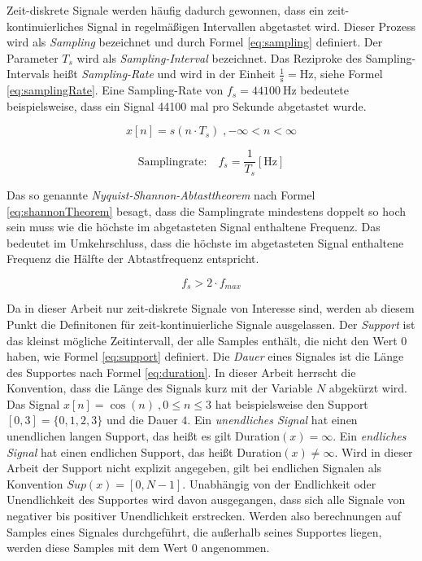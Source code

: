 Zeit-diskrete Signale werden häufig dadurch gewonnen, dass ein zeit-kontinuierliches Signal in regelmäßigen Intervallen abgetastet wird. Dieser Prozess wird als \emph{Sampling} bezeichnet und durch Formel \ref{eq:sampling} definiert. Der Parameter $T_s$ wird als \emph{Sampling-Interval} bezeichnet. Das Reziproke des Sampling-Intervals heißt \emph{Sampling-Rate} und wird in der Einheit $\frac{1}{\text{s}} = \text{Hz}$, siehe Formel \ref{eq:samplingRate}. Eine Sampling-Rate von $f_s = \SI{44100}{\hertz}$ bedeutete beispielsweise, dass ein Signal 44100 mal pro Sekunde abgetastet wurde.\cite[S. 24]{dspMichigan}

\begin{equation}
x[n] = s(n \cdot T_s) \; , -\infty < n < \infty
\label{eq:sampling}
\end{equation}
	
\begin{equation}
	\text{Samplingrate:} \quad f_s = \frac{1}{T_s} [\text{Hz}]
	\label{eq:samplingRate}
\end{equation}	

Das so genannte \emph{Nyquist-Shannon-Abtasttheorem} nach Formel \ref{eq:shannonTheorem} besagt, dass die Samplingrate mindestens doppelt so hoch sein muss wie die höchste im abgetasteten Signal enthaltene Frequenz. Das bedeutet im Umkehrschluss, dass die höchste im abgetasteten Signal enthaltene Frequenz die Hälfte der Abtastfrequenz entspricht.

\begin{equation}
f_s > 2 \cdot f_{max}
\label{eq:shannonTheorem}
\end{equation}	
	
Da in dieser Arbeit nur zeit-diskrete Signale von Interesse sind, werden ab diesem Punkt die Definitonen für zeit-kontinuierliche Signale ausgelassen. Der \emph{Support} ist das kleinst mögliche Zeitintervall, der alle Samples enthält, die nicht den Wert 0 haben, wie Formel \ref{eq:support} definiert. Die \emph{Dauer} eines Signales ist die Länge des Supportes nach Formel \ref{eq:duration}. In dieser Arbeit herrscht die Konvention, dass die Länge des Signals kurz mit der Variable $N$ abgekürzt wird. Das Signal $x[n] = \cos(n) \: ,0\leq n \leq 3$ hat beispielsweise den Support $[0,3] = \{0,1,2,3\} $ und die Dauer $4$. Ein \emph{unendliches Signal} hat einen unendlichen langen Support, das heißt es gilt Duration$(x) = \infty$. Ein \emph{endliches Signal} hat einen endlichen Support, das heißt Duration$(x) \neq\infty$. Wird in dieser Arbeit der Support nicht explizit angegeben, gilt bei endlichen Signalen als Konvention $Sup(x) = [0,N-1]$. Unabhängig von der Endlichkeit oder Unendlichkeit des Supportes wird davon ausgegangen, dass sich alle Signale von negativer bis positiver Unendlichkeit erstrecken. Werden also berechnungen auf Samples eines Signales durchgeführt, die außerhalb seines Supportes liegen, werden diese Samples mit dem Wert 0 angenommen. \cite[S. 24]{dspMichigan}

